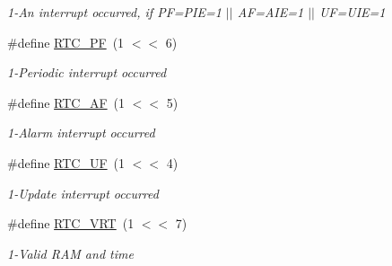 \begin{DoxyCompactItemize}
\begin{DoxyCompactList}\small\item\em 1-\/\-An interrupt occurred, if P\-F=P\-I\-E=1 $|$$|$ A\-F=A\-I\-E=1 $|$$|$ U\-F=U\-I\-E=1 \end{DoxyCompactList}\item 
\hypertarget{group___r_t_c_ga9d9fa73fa39aa2500273df240594afe6}{\#define \hyperlink{group___r_t_c_ga9d9fa73fa39aa2500273df240594afe6}{R\-T\-C\-\_\-\-P\-F}~(1 $<$$<$ 6)}\label{group___r_t_c_ga9d9fa73fa39aa2500273df240594afe6}

\begin{DoxyCompactList}\small\item\em 1-\/\-Periodic interrupt occurred \end{DoxyCompactList}\item 
\hypertarget{group___r_t_c_ga0ed62fab6c50790f2c4b71849f2000b2}{\#define \hyperlink{group___r_t_c_ga0ed62fab6c50790f2c4b71849f2000b2}{R\-T\-C\-\_\-\-A\-F}~(1 $<$$<$ 5)}\label{group___r_t_c_ga0ed62fab6c50790f2c4b71849f2000b2}

\begin{DoxyCompactList}\small\item\em 1-\/\-Alarm interrupt occurred \end{DoxyCompactList}\item 
\hypertarget{group___r_t_c_ga7c63615d9172c9065f5b9d1875ef6d04}{\#define \hyperlink{group___r_t_c_ga7c63615d9172c9065f5b9d1875ef6d04}{R\-T\-C\-\_\-\-U\-F}~(1 $<$$<$ 4)}\label{group___r_t_c_ga7c63615d9172c9065f5b9d1875ef6d04}

\begin{DoxyCompactList}\small\item\em 1-\/\-Update interrupt occurred \end{DoxyCompactList}\item 
\hypertarget{group___r_t_c_ga35577ed27885901641e6120257455adb}{\#define \hyperlink{group___r_t_c_ga35577ed27885901641e6120257455adb}{R\-T\-C\-\_\-\-V\-R\-T}~(1 $<$$<$ 7)}\label{group___r_t_c_ga35577ed27885901641e6120257455adb}

\begin{DoxyCompactList}\small\item\em 1-\/\-Valid R\-A\-M and time \end{DoxyCompactList}\end{DoxyCompactItemize}
